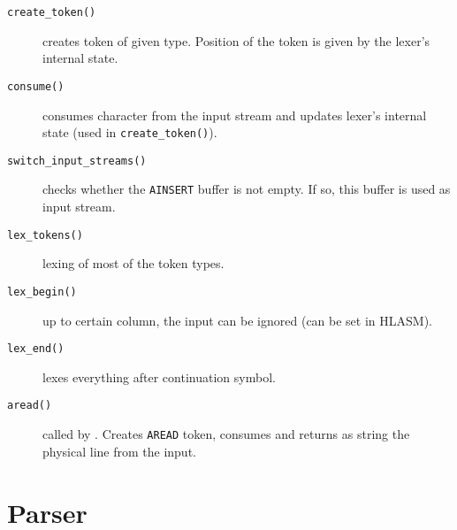 \begin{description}
\begin{description}
			\item[\texttt{create\_token()}] creates token of given type. Position of the token is given by the lexer's internal state. 
			
			\item[\texttt{consume()}] consumes character from the input stream and updates lexer's internal state (used in \texttt{create\_token()}).
			
			\item[\texttt{switch\_input\_streams()}] checks whether the \texttt{AINSERT} buffer is not empty. If so, this buffer is used as input stream.
			
			\item[\texttt{lex\_tokens()}] lexing of most of the token types.
			
			\item[\texttt{lex\_begin()}] up to certain column, the input can be ignored (can be set in HLASM).
			
			\item[\texttt{lex\_end()}] lexes everything after continuation symbol.
			
			\item[\texttt{aread()}] called by . Creates \texttt{AREAD} token, consumes and returns as string the physical line from the input.
			
		\end{description}
		
\end{description}



\section{Parser}
